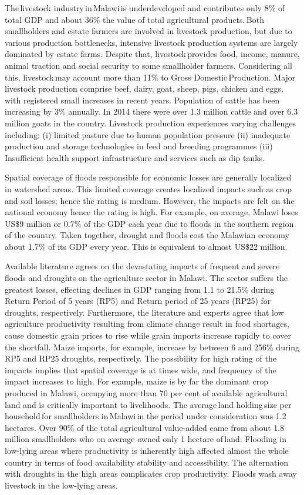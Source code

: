 \documentclass[
]{book}
\begin{document}
The\,livestock industry\,in\,Malawi\,is underdeveloped and contributes only 8\% of total GDP and about 36\% the value of total agricultural products.\,Both smallholders
and estate farmers are involved in livestock production, but due to various production bottlenecks, intensive livestock production systems are largely dominated
by estate farms. Despite that, livestock\,provides food, income, manure, animal traction and social security to some smallholder farmers. Considering all this,
livestock\,may account more than 11\% to Gross Domestic\,Production. Major livestock production comprise beef, dairy, goat, sheep, pigs, chicken and eggs, with
registered small increases in recent years. Population of cattle has been increasing by 3\% annually. In 2014 there were over 1.3 million cattle and over 6.3
million goats in the country. Livestock production experiences varying challenges including: (i) limited pasture due to human population pressure (ii) inadequate
production and storage technologies in feed and breeding programmes (iii) Insufficient health support infrastructure and services such as dip tanks.

Spatial coverage of floods responsible for economic losses are generally localized in watershed areas. This limited coverage creates localized impacts such as
crop and soil losses; hence the rating is medium. However, the impacts are felt on the national economy hence the rating is high. For example, on average, Malawi
loses US\$9 million or 0.7\% of the GDP each year due to floods in the southern region of the country. Taken together, drought and floods cost the Malawian economy
about 1.7\% of its GDP every year. This is equivalent to almost US\$22 million.

Available literature agrees on the devastating impacts of frequent and severe floods and droughts on the agriculture sector in Malawi. The sector suffers the
greatest losses, effecting declines in GDP ranging from 1.1 to 21.5\% during Return Period of 5 years (RP5) and Return period of 25 years (RP25) for droughts,
respectively. Furthermore, the literature and experts agree that low agriculture productivity resulting from climate change result in food shortages, cause
domestic grain prices to rise while grain imports increase rapidly to cover the shortfall. Maize imports, for example, increase by between 6 and 256\% during RP5
and RP25 droughts, respectively. The possibility for high rating of the impacts implies that spatial coverage is at times wide, and frequency of the impact
increases to high. For example, maize is by far the dominant crop produced in Malawi, occupying more than 70 per cent of available agricultural land and is
critically important to livelihoods. The average\,land holding\,size per\,household\,for smallholders in\,Malawi\,in the period under consideration was 1.2 hectares.
Over 90\% of the total agricultural value-added came from about 1.8 million smallholders who on average owned only 1 hectare of\,land. Flooding in low-lying areas
where productivity is inherently high affected almost the whole country in terms of food availability stability and accessibility. The alternation with droughts
in the high areas complicates crop productivity. Floods wash away livestock in the low-lying areas.
\end{document}
